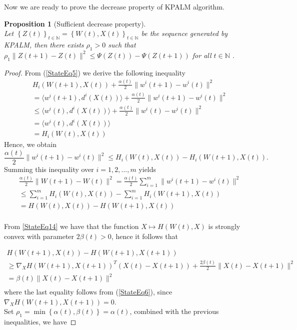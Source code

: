 \documentclass[11pt]{article}
\numberwithin{equation}{section}
\newtheorem{proposition}{Proposition}[section]
\begin{document}
Now we are ready to prove the decrease property of KPALM algorithm.

\begin{proposition}[Sufficient decrease property]\ \\
Let $\left\lbrace Z(t) \right\rbrace_{t \in \mathbb{N}} = \left\lbrace W(t) , X(t) \right\rbrace_{t \in \mathbb{N}}$ be the sequence generated by KPALM, then there exists $\rho_1 > 0$ such that $\rho_1 \|Z(t+1) - Z(t)\|^2 \leq \Psi(Z(t)) - \Psi(Z(t+1))$ for all $t \in \mathbb{N}$ .
\end{proposition}

\begin{proof}
From (\ref{StateEq5}) we derive the following inequality
\begin{equation*}
	\begin{split}
	H_i(W(t+1),X(t)) + \frac{\alpha(t)}{2} \|w^i(t+1) - w^i(t)\|^2 \\
	= \langle w^i(t+1) , d^i(X(t)) \rangle + \frac{\alpha(t)}{2} \|w^i(t+1) - w^i(t)\|^2 \\
	\leq \langle w^i(t) , d^i(X(t)) \rangle + \frac{\alpha(t)}{2} \|w^i(t) - w^i(t)\|^2 \\
	= \langle w^i(t) , d^i(X(t)) \rangle \\
	= H_i(W(t),X(t))
	\end{split}
\end{equation*}
Hence, we obtain
\begin{equation*}
	\frac{\alpha(t)}{2} \|w^i(t+1) - w^i(t)\|^2 
	\leq H_i(W(t),X(t)) - H_i(W(t+1),X(t)) .
\end{equation*}
Summing this inequality over $i=1, 2, \ldots ,m$ yields
\begin{equation*}
	\begin{split}
	\frac{\alpha(t)}{2} \|W(t+1) - W(t)\|^2 
	= \frac{\alpha(t)}{2} \sum\limits_{i=1}^{m} \|w^i(t+1) - w^i(t)\|^2 \\
	\leq \sum\limits_{i=1}^{m} H_i(W(t),X(t)) - \sum\limits_{i=1}^{m} H_i(W(t+1),X(t)) \\
	= H(W(t),X(t)) - H(W(t+1),X(t)) \\
	\end{split}
\end{equation*}

From \cref{StateEq14} we have that the function $X \mapsto H(W(t),X)$ is strongly convex with parameter $2 \beta(t) > 0$, hence it follows that

\begin{equation*}
	\begin{split}
	H(W(t+1),X(t)) - H(W(t+1),X(t+1)) \\
	\geq \nabla_X H(W(t+1),X(t+1))^{T}(X(t)-X(t+1)) + \frac{2\beta(t)}{2} \|X(t) - X(t+1)\|^2 \\
	= \beta(t) \|X(t) - X(t+1)\|^2 \\
	\end{split}
\end{equation*}
where the last equality follows from (\ref{StateEq6}), since $\nabla_{X} H(W(t+1), X(t+1)) = 0$. \\
Set $\rho_1 = \min\left\lbrace \alpha(t) , \beta(t) \right\rbrace = \alpha(t)$, combined with the previous inequalities, we have


\end{proof}
\end{document}
